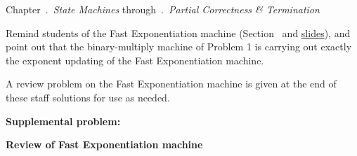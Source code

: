\documentclass[handout]{mcs}
\begin{document}

\begin{staffnotes}
Chapter~.\ \emph{State Machines}
through~.\ \emph{Partial Correctness \&
  Termination}
\end{staffnotes}


\begin{staffnotes}
Remind students of the Fast Exponentiation machine
(Section~ and
\href{https://courses.csail.mit.edu/6.042/spring16/slidepdfs/state-machines.pdf}{slides}),
and point out that the binary-multiply machine of Problem 1 is
carrying out exactly the exponent updating of the Fast Exponentiation
machine.

A review problem on the Fast Exponentiation machine is given at the
end of these staff solutions for use as needed.
\end{staffnotes}




\textbf{Supplemental problem:}


\begin{staffnotes}

\begin{center}
\textbf{Review of Fast Exponentiation machine}
\end{center}


\end{staffnotes}

\end{document}
